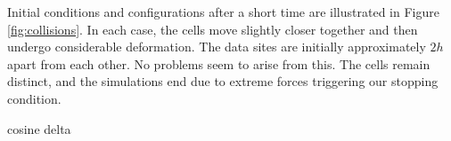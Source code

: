Initial conditions and configurations after a short time are illustrated in Figure~%
\ref{fig:collisions}. In each case, the cells move slightly closer together and then
undergo considerable deformation. The data sites are initially approximately $2h$ apart
from each other. No problems seem to arise from this. The cells remain distinct, and
the simulations end due to extreme forces triggering our stopping condition.

{\XXX} cosine delta

